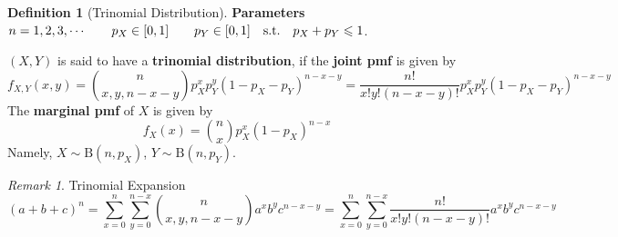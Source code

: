 \documentclass[10pt,UTF8]{article}
\newenvironment{definition box}
{\begin{tcolorbox}[colback=blue!5!white,colframe=blue!75!black,parbox=false,before upper=\par,before lower=\par]}
{\end{tcolorbox}}
\newenvironment{theorem box}
{\begin{tcolorbox}[colback=yellow!5!white,colframe=yellow!75!black,parbox=false,before upper=\par,before lower=\par]}
{\end{tcolorbox}}
\theoremstyle{definition}
\newtheorem{definition inner}{Definition}[section]
\newenvironment{definition}[1][]
{\begin{definition box}\begin{definition inner}[#1]\hfill\par}
{\end{definition inner}\end{definition box}}
\theoremstyle{plain}
\newtheorem{theorem inner}{Theorem}[section]
\theoremstyle{definition}
\newtheorem*{proof inner}{\textit{Proof}}
\theoremstyle{remark}
\newtheorem*{remark}{\textit{Remark}}
\begin{document}
\begin{definition}[Trinomial Distribution]
    \textbf{Parameters}\qquad $n=1,2,3,\cdots \qquad p_X\in[0,1]
    \qquad p_Y\in[0,1] \qq{s.t.} p_X+p_Y\leqslant 1$.

    $(X,Y)$ is said to have a \textbf{trinomial distribution},
    if the \textbf{joint pmf} is given by
    \begin{equation*}
        f_{X,Y}(x,y) = \binom{n}{x,y,n-x-y}p_X^x p_Y^y (1-p_X-p_Y)^{n-x-y}
        = \frac{n!}{x!y!(n-x-y)!}p_X^x p_Y^y (1-p_X-p_Y)^{n-x-y}
    \end{equation*}
    The \textbf{marginal pmf} of $X$ is given by
    \begin{equation*}
        f_X(x) = \binom{n}{x}p_X^x(1-p_X)^{n-x}
    \end{equation*}
    Namely, $X\sim\mathrm{B}(n,p_X)$, $Y\sim\mathrm{B}(n,p_Y)$.
\end{definition}

\begin{remark}
    Trinomial Expansion
    \begin{equation*}
        (a+b+c)^n = \sum_{x=0}^{n}\sum_{y=0}^{n-x}
        \binom{n}{x,y,n-x-y}a^x b^y c^{n-x-y}
        = \sum_{x=0}^{n}\sum_{y=0}^{n-x}
        \frac{n!}{x!y!(n-x-y)!}a^x b^y c^{n-x-y}
    \end{equation*}
\end{remark}
\end{document}
